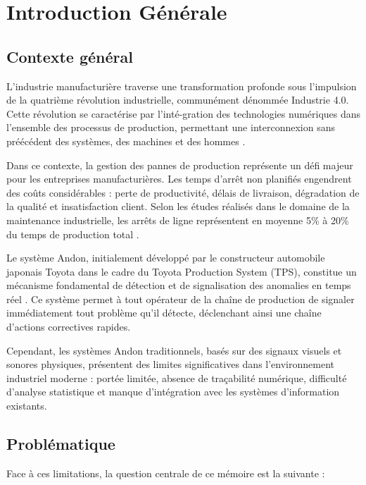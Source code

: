 \chapter{Introduction G\'en\'erale}

\section{Contexte g\'en\'eral}

L'industrie manufacturi\`ere traverse une transformation profonde sous l'impulsion de la quatri\`eme r\'evolution industrielle, commun\'ement d\'enomm\'ee Industrie 4.0. Cette r\'evolution se caract\'erise par l'int\'e-gration des technologies num\'eriques dans l'ensemble des processus de production, permettant une interconnexion sans pr\'e\'ec\'edent des syst\`emes, des machines et des hommes \cite{xu2018industry}.

Dans ce contexte, la gestion des pannes de production repr\'esente un d\'efi majeur pour les entreprises manufacturi\`eres. Les temps d'arr\^et non planifi\'es engendrent des co\^uts consid\'erables : perte de productivit\'e, d\'elais de livraison, d\'egradation de la qualit\'e et insatisfaction client. Selon les \'etudes r\'ealis\'es dans le domaine de la maintenance industrielle, les arr\^ets de ligne repr\'esentent en moyenne 5\% \`a 20\% du temps de production total \cite{schwab2017fourth}.

Le syst\`eme Andon, initialement d\'evelopp\'e par le constructeur automobile japonais Toyota dans le cadre du Toyota Production System (TPS), constitue un m\'ecanisme fondamental de d\'etection et de signalisation des anomalies en temps r\'eel \cite{liker2004toyota}. Ce syst\`eme permet \`a tout op\'erateur de la cha\^ine de production de signaler imm\'ediatement tout probl\`eme qu'il d\'etecte, d\'eclenchant ainsi une cha\^ine d'actions correctives rapides.

Cependant, les syst\`emes Andon traditionnels, bas\'es sur des signaux visuels et sonores physiques, pr\'esentent des limites significatives dans l'environnement industriel moderne : port\'ee limit\'ee, absence de tra\c{c}abilit\'e num\'erique, difficult\'e d'analyse statistique et manque d'int\'egration avec les syst\`emes d'information existants.

\section{Probl\'ematique}

Face \`a ces limitations, la question centrale de ce m\'emoire est la suivante :

